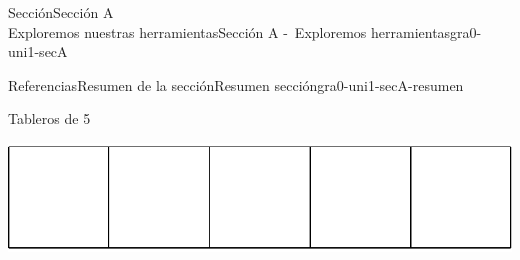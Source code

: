 \begin{sectionptx}{Sección}{{\Large Sección A\\}Exploremos nuestras herramientas}{}{Sección A -~Exploremos herramientas}{}{}{gra0-uni1-secA}
\begin{references-subsection}{Referencias}{Resumen de la sección}{}{Resumen sección}{}{}{gra0-uni1-secA-resumen}
\begin{sidebyside}{2}{0.05}{0.05}{0.1}
\begin{sbspanel}{0.4}%
Tableros de 5%
\par
\includegraphics[max width=\linewidth, center]{external/svg-source/tikz-file-148144.pdf}
\end{sbspanel}%
\begin{sbspanel}{0.4}%
%
\end{sbspanel}%
\end{sidebyside}%
\end{references-subsection}
\end{sectionptx}
%
%
\typeout{************************************************}
\typeout{************************************************}
%
